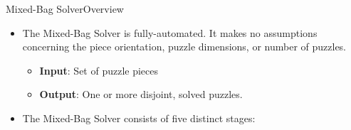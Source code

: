 \documentclass[10pt]{beamer}
\begin{document}
\begin{frame}{Mixed-Bag Solver}{Overview}
  \begin{itemize}
    \item The Mixed-Bag Solver is fully-automated.  It makes no assumptions concerning the piece orientation, puzzle dimensions, or number of puzzles.
    \vspace{0.4em}
    \begin{itemize}
      \setlength\itemsep{0.8em}
      \item \textbf{Input}: Set of puzzle pieces
      \item \textbf{Output}: One or more disjoint, solved puzzles.
    \end{itemize}
    \vfill    
    \item The Mixed-Bag Solver consists of five distinct stages:
	  \vspace{-0.4em}
  \end{itemize}
  \begin{center}
    \vfill    
  \end{center}
\end{frame}
\end{document}
